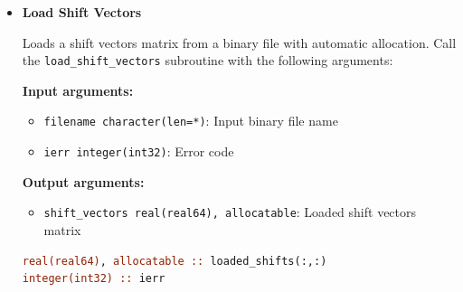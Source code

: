 \begin{enumerate}
\begin{itemize}
                  Saves a shift vectors matrix to a binary file. Call the \texttt{save\_shift\_vectors}
                  subroutine with the following arguments:
                  
                  \textbf{Input arguments:}
                  \begin{itemize}
                    \item \texttt{shift\_vectors real(real64)}: 2D shift vectors matrix
                          
                    \item \texttt{filename character(len=*)}: Output binary file name
                          
                    \item \texttt{ierr integer(int32)}: Error code
                  \end{itemize}
                  \begin{lstlisting}[language=Fortran, caption={Save Shift Vectors}]
real(real64) :: shift_vecs(134, 88327)  ! 2xsamples x genes
integer(int32) :: ierr

call save_shift_vectors(shift_vecs, 'shift_vectors.bin', ierr)
                  \end{lstlisting}
                  
            \item \textbf{Load Shift Vectors}
                  
                  Loads a shift vectors matrix from a binary file with automatic allocation.
                  Call the \texttt{load\_shift\_vectors} subroutine with the following arguments:
                  
                  \textbf{Input arguments:}
                  \begin{itemize}
                    \item \texttt{filename character(len=*)}: Input binary file name
                          
                    \item \texttt{ierr integer(int32)}: Error code
                  \end{itemize}
                  \textbf{Output arguments:}
                  \begin{itemize}
                    \item \texttt{shift\_vectors real(real64), allocatable}: Loaded shift
                          vectors matrix
                  \end{itemize}
                  \begin{lstlisting}[language=Fortran, caption={Load Shift Vectors}]
real(real64), allocatable :: loaded_shifts(:,:)
integer(int32) :: ierr


\end{lstlisting}
\end{itemize}
\end{enumerate}
